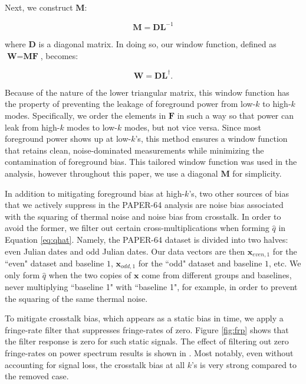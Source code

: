 \documentclass[preprint2,numberedappendix,tighten]{aastex6}  %
\begin{document}
\noindent Next, we construct $\textbf{M}$:

\begin{equation}
\textbf{M} = \textbf{DL}^{-1}
\end{equation}

\noindent where $\textbf{D}$ is a diagonal matrix. In doing so, our window function, defined as $\textbf{W} = \textbf{MF}$, 
becomes:

\begin{equation}
\textbf{W} = \textbf{DL}^{\dagger}.
\end{equation}

\noindent Because of the nature of the lower triangular matrix, this window function has the property of preventing the leakage 
of foreground power from low-$k$ to high-$k$ modes. Specifically, we order the elements in $\textbf{F}$ in such a way so that 
power can leak from high-$k$ modes to low-$k$ modes, but not vice versa. Since most foreground power shows up at low-$k$'s, this method ensures a window function that retains clean, noise-dominated measurements while minimizing the 
contamination of foreground bias. This tailored window function was used in the  analysis, however throughout this paper, we use a diagonal $\textbf{M}$ for simplicity.

In addition to mitigating foreground bias at high-$k$'s, two other sources of bias that we actively suppress in the PAPER-64 
analysis are noise bias associated with the squaring of thermal noise and noise bias from crosstalk. In order to avoid the 
former, we filter out certain cross-multiplications when forming $\widehat{q}$ in Equation \eqref{eq:qhat}. Namely, the PAPER-64 
dataset is divided into two halves: even Julian dates and odd Julian dates. Our data vectors are then $\textbf{x}_{even, 1}$ for 
the ``even" dataset and baseline $1$, $\textbf{x}_{odd, 1}$ for the ``odd" dataset and baseline $1$, etc. We only form 
$\widehat{q}$ when the two copies of $\textbf{x}$ come from different groups and baselines, never multiplying ``baseline 1" with ``baseline 1", for 
example, in order to prevent the squaring of the same thermal noise. 

To mitigate crosstalk bias, which appears as a static bias in time, we apply a fringe-rate filter that suppresses fringe-rates of 
zero. Figure \ref{fig:frp} shows that the filter response is zero for such static signals. The effect of filtering out zero fringe-rates 
on power spectrum results is shown in . Most notably, even without accounting for signal loss, the crosstalk bias at all $k$'s is very strong compared to the removed case.
\end{document}
